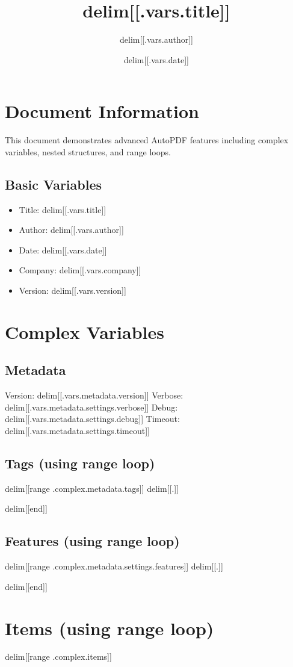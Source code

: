 \documentclass{article}
\title{delim[[.vars.title]]}
\author{delim[[.vars.author]]}
\date{delim[[.vars.date]]}
\begin{document}
\maketitle

\section{Document Information}
This document demonstrates advanced AutoPDF features including complex variables, nested structures, and range loops.

\subsection{Basic Variables}
\begin{itemize}
\item Title: delim[[.vars.title]]
\item Author: delim[[.vars.author]]
\item Date: delim[[.vars.date]]
\item Company: delim[[.vars.company]]
\item Version: delim[[.vars.version]]
\end{itemize}

\section{Complex Variables}
\subsection{Metadata}
Version: delim[[.vars.metadata.version]]
Verbose: delim[[.vars.metadata.settings.verbose]]
Debug: delim[[.vars.metadata.settings.debug]]
Timeout: delim[[.vars.metadata.settings.timeout]]

\subsection{Tags (using range loop)}
delim[[range .complex.metadata.tags]]
delim[[.]]\par
delim[[end]]

\subsection{Features (using range loop)}
delim[[range .complex.metadata.settings.features]]
delim[[.]]\par
delim[[end]]

\section{Items (using range loop)}
delim[[range .complex.items]]
\end{document}
